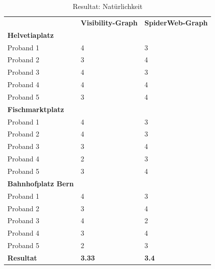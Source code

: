 \begin{table}[H]
    \centering
    \caption{Resultat: Natürlichkeit}
    \label{table:Resultat Natürlichkeit}
    \begin{tabular}{lll}
        & \textbf{Visibility-Graph} & \textbf{SpiderWeb-Graph} \\
        \textbf{Helvetiaplatz}   &                          &                          \\
        Proband 1                & 4                        & 3                        \\
        Proband 2                & 3                        & 4                        \\
        Proband 3                & 4                        & 3                        \\
        Proband 4                & 4                        & 4                        \\
        Proband 5                & 3                        & 4                        \\
        \textbf{Fischmarktplatz} &                          &                          \\
        Proband 1                & 4                        & 3                        \\
        Proband 2                & 4                        & 3                        \\
        Proband 3                & 3                        & 4                        \\
        Proband 4                & 2                        & 3                        \\
        Proband 5                & 3                        & 4                        \\
        \textbf{Bahnhofplatz Bern} &                        &                          \\
        Proband 1                & 4                        & 3                        \\
        Proband 2                & 3                        & 4                        \\
        Proband 3                & 4                        & 2                        \\
        Proband 4                & 3                        & 4                        \\
        Proband 5                & 2                        & 3                        \\
        \textbf{Resultat}        & \textbf{3.33}               & \textbf{3.4}                       
    \end{tabular}
\end{table}

